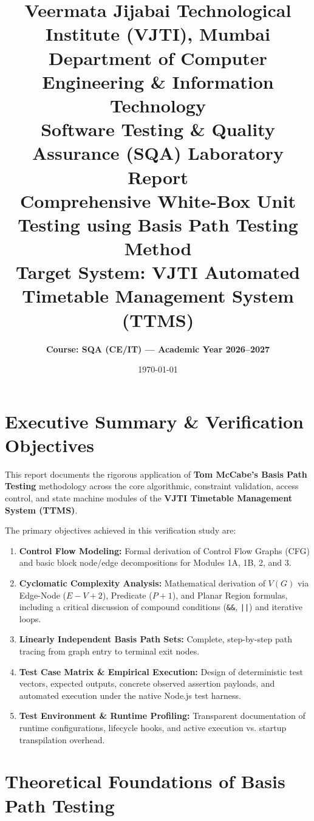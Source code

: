 \documentclass[11pt,a4paper]{article}
\title{
    \textbf{Veermata Jijabai Technological Institute (VJTI), Mumbai}\\
    \large Department of Computer Engineering \& Information Technology\\[0.5em]
    \Large \textbf{Software Testing \& Quality Assurance (SQA) Laboratory Report}\\[0.3em]
    \large \textbf{Comprehensive White-Box Unit Testing using Basis Path Testing Method}\\[0.2em]
    \normalsize Target System: VJTI Automated Timetable Management System (TTMS)
}
\author{\textbf{Course: SQA (CE/IT) --- Academic Year 2026--2027}}
\date{\today}
\begin{document}
\maketitle
\tableofcontents
\newpage

\section{Executive Summary \& Verification Objectives}
This report documents the rigorous application of \textbf{Tom McCabe's Basis Path Testing} methodology across the core algorithmic, constraint validation, access control, and state machine modules of the \textbf{VJTI Timetable Management System (TTMS)}.

The primary objectives achieved in this verification study are:
\begin{enumerate}
    \item \textbf{Control Flow Modeling:} Formal derivation of Control Flow Graphs (CFG) and basic block node/edge decompositions for Modules 1A, 1B, 2, and 3.
    \item \textbf{Cyclomatic Complexity Analysis:} Mathematical derivation of $V(G)$ via Edge-Node ($E - V + 2$), Predicate ($P + 1$), and Planar Region formulas, including a critical discussion of compound conditions (\texttt{\&\&}, \texttt{||}) and iterative loops.
    \item \textbf{Linearly Independent Basis Path Sets:} Complete, step-by-step path tracing from graph entry to terminal exit nodes.
    \item \textbf{Test Case Matrix \& Empirical Execution:} Design of deterministic test vectors, expected outputs, concrete observed assertion payloads, and automated execution under the native Node.js test harness.
    \item \textbf{Test Environment \& Runtime Profiling:} Transparent documentation of runtime configurations, lifecycle hooks, and active execution vs. startup transpilation overhead.
\end{enumerate}

\section{Theoretical Foundations of Basis Path Testing}
\end{document}
